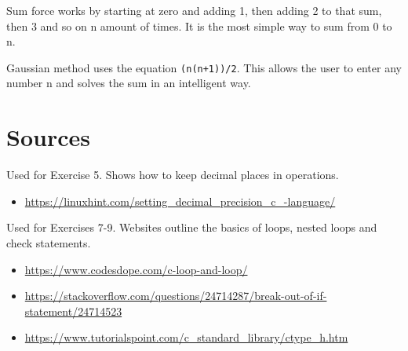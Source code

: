 \documentclass{article}
\begin{document}
Sum force works by starting at zero and adding 1, then adding 2 to that sum, then 3 and so on n amount of times. It is the most simple way to sum from 0 to n.

Gaussian method uses the equation \texttt{(n(n+1))/2}. This allows the user to enter any number n and solves the sum in an intelligent way. 

\newpage
\section{Sources}

Used for Exercise 5. Shows how to keep decimal places in operations.
\begin{itemize}
\item{\url{https://linuxhint.com/setting_decimal_precision_c_-language/}}
\end{itemize}

Used for Exercises 7-9. Websites outline the basics of loops, nested loops and check statements.
\begin{itemize}
\item{\url{https://www.codesdope.com/c-loop-and-loop/}}
\item{\url{https://stackoverflow.com/questions/24714287/break-out-of-if-statement/24714523}}
\item{\url{https://www.tutorialspoint.com/c_standard_library/ctype_h.htm}}
\end{itemize}
\end{document}
